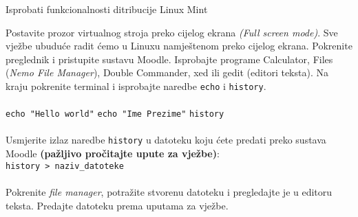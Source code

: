  \begin{zadatak} Isprobati funkcionalnosti ditribucije Linux Mint

Postavite prozor virtualnog stroja preko cijelog ekrana \textit{(Full screen mode)}. Sve vježbe ubuduće radit ćemo u Linuxu namještenom preko cijelog ekrana. Pokrenite preglednik i pristupite sustavu Moodle. Isprobajte programe Calculator, Files (\textit{Nemo File Manager}), Double Commander, xed ili gedit (editori teksta). Na kraju pokrenite terminal i isprobajte naredbe \texttt{echo} i \texttt{history}.
\\
\\
\texttt{echo "Hello world"}\break
\texttt{echo "Ime Prezime"}\break
\texttt{history}
\\
\\
Usmjerite izlaz naredbe \texttt{history} u datoteku koju ćete predati preko sustava Moodle \textbf{(pažljivo pročitajte upute za vježbe)}:\\
\texttt{history  \textgreater \  naziv\_datoteke}
\\
\\
Pokrenite \textit{file manager}, potražite stvorenu datoteku i pregledajte je u editoru teksta.
Predajte datoteku prema uputama za vježbe. 

\end{zadatak}